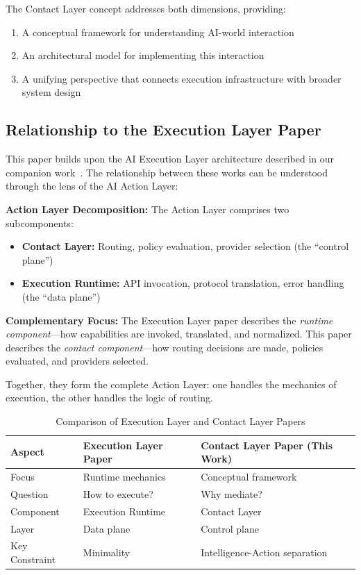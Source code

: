 The Contact Layer concept addresses both dimensions, providing:
\begin{enumerate}[label=\arabic*.]
\item A conceptual framework for understanding AI-world interaction
\item An architectural model for implementing this interaction
\item A unifying perspective that connects execution infrastructure with broader system design
\end{enumerate}

\subsection{Relationship to the Execution Layer Paper}
This paper builds upon the AI Execution Layer architecture described in our companion work~\cite{wang2026execution}. The relationship between these works can be understood through the lens of the AI Action Layer:

\textbf{Action Layer Decomposition:} The Action Layer comprises two subcomponents:
\begin{itemize}[leftmargin=*]
\item \textbf{Contact Layer:} Routing, policy evaluation, provider selection (the ``control plane'')
\item \textbf{Execution Runtime:} API invocation, protocol translation, error handling (the ``data plane'')
\end{itemize}

\textbf{Complementary Focus:} The Execution Layer paper describes the \textit{runtime component}---how capabilities are invoked, translated, and normalized. This paper describes the \textit{contact component}---how routing decisions are made, policies evaluated, and providers selected.

Together, they form the complete Action Layer: one handles the mechanics of execution, the other handles the logic of routing.

\begin{table}[h]
\centering
\caption{Comparison of Execution Layer and Contact Layer Papers}
\begin{tabular}{lll}
\toprule
\textbf{Aspect} & \textbf{Execution Layer Paper~\cite{wang2026execution}} & \textbf{Contact Layer Paper (This Work)} \\
\midrule
Focus & Runtime mechanics & Conceptual framework \\
Question & How to execute? & Why mediate? \\
Component & Execution Runtime & Contact Layer \\
Layer & Data plane & Control plane \\
Key Constraint & Minimality & Intelligence-Action separation \\
\bottomrule
\end{tabular}
\end{table}

